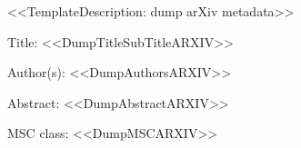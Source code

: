 <<TemplateDescription: dump arXiv metadata>>

Title:
<<DumpTitleSubTitleARXIV>>


Author(s):
<<DumpAuthorsARXIV>>


Abstract:
<<DumpAbstractARXIV>>


MSC class:
<<DumpMSCARXIV>>
